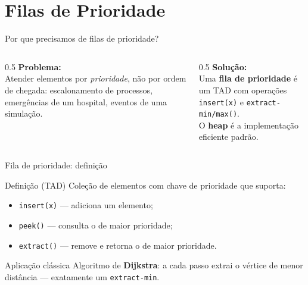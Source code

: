 \documentclass[aspectratio=169]{beamer}
\begin{document}
\section{Filas de Prioridade}

\begin{frame}{Por que precisamos de filas de prioridade?}
  \begin{columns}[T]
    \begin{column}{0.5\textwidth}
      \textbf{Problema:}\\[0.3em]
      Atender elementos por \emph{prioridade}, não por ordem de chegada:
      escalonamento de processos, emergências de um hospital, eventos de uma
      simulação.
    \end{column}
    \begin{column}{0.5\textwidth}
      \textbf{Solução:}\\[0.3em]
      Uma \textbf{fila de prioridade} é um TAD com operações
      \texttt{insert(x)} e \texttt{extract-min/max()}.\\[0.3em]
      O \textbf{heap} é a implementação eficiente padrão.
    \end{column}
  \end{columns}
\end{frame}

\begin{frame}{Fila de prioridade: definição}
  \begin{block}{Definição (TAD)}
    Coleção de elementos com chave de prioridade que suporta:
    \begin{itemize}
      \item \texttt{insert(x)} — adiciona um elemento;
      \item \texttt{peek()} — consulta o de maior prioridade;
      \item \texttt{extract()} — remove e retorna o de maior prioridade.
    \end{itemize}
  \end{block}
  \begin{exampleblock}{Aplicação clássica}
    Algoritmo de \textbf{Dijkstra}: a cada passo extrai o vértice de menor
    distância — exatamente um \texttt{extract-min}.
  \end{exampleblock}
\end{frame}
\end{document}
